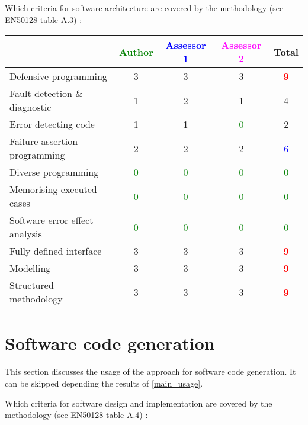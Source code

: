 Which criteria for software architecture are covered by the methodology
(see EN50128 table A.3) :

\begin{tabular}{|l | c | c | c | c|}
\hline
& \textcolor{green}{Author} & \textcolor{blue}{Assessor 1} & \textcolor{magenta}{Assessor 2} & Total \\
\hline
Defensive programming  & 3     & 3     & 3     & \textcolor{red}{\textbf{9}} \\
\hline 
Fault detection \& diagnostic  & 1     & 2     & 1     & 4     \\
\hline
Error detecting code  & 1     & 1     & \textcolor{green}{0} & 2     \\
\hline
Failure assertion programming & 2      & 2     & 2     & \textcolor{blue}{6} \\
\hline
Diverse programming & \textcolor{green}{0} & \textcolor{green}{0} & \textcolor{green}{0} & \textcolor{green}{0} \\
\hline
Memorising executed cases & \textcolor{green}{0} & \textcolor{green}{0} & \textcolor{green}{0} & \textcolor{green}{0} \\
\hline
Software error effect analysis & \textcolor{green}{0} & \textcolor{green}{0} & \textcolor{green}{0} & \textcolor{green}{0} \\
\hline
Fully defined interface & 3     & 3     & 3     & \textcolor{red}{\textbf{9}} \\
\hline
Modelling  & 3     & 3     & 3     & \textcolor{red}{\textbf{9}} \\
\hline
Structured methodology & 3     & 3     & 3     & \textcolor{red}{\textbf{9}} \\
\hline
\end{tabular}

\section{Software code generation}
This section discusses the usage of the approach for software code generation.
It can be skipped depending the results of \ref{main_usage}.

Which criteria for software design and implementation are covered by the methodology
(see EN50128 table A.4) :

